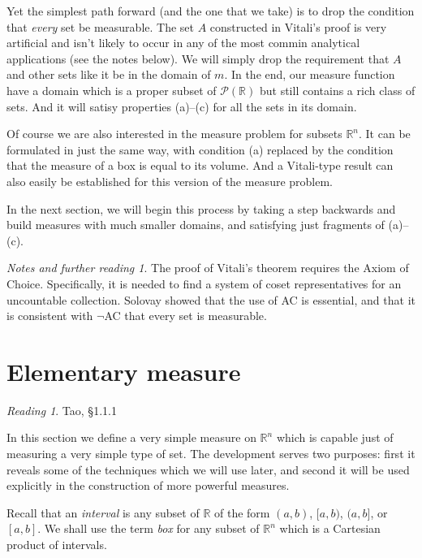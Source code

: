 \documentclass[11pt,oneside]{amsbook}
\newcommand{\RR}{\mathbb R}
\theoremstyle{definition}
\theoremstyle{plain}
\theoremstyle{definition}
\theoremstyle{remark}
\newtheorem*{notes}{Notes and further reading}
\newtheorem*{reading}{Reading}
\numberwithin{equation}{section}
\numberwithin{figure}{section}
\begin{document}
Yet the simplest path forward (and the one that we take) is to drop the condition that \emph{every} set be measurable. The set $A$ constructed in Vitali's proof is very artificial and isn't likely to occur in any of the most commin analytical applications (see the notes below). We will simply drop the requirement that $A$ and other sets like it be in the domain of $m$. In the end, our measure function have a domain which is a proper subset of $\mathcal P(\RR)$ but still contains a rich class of sets. And it will satisy properties (a)--(c) for all the sets in its domain.

Of course we are also interested in the measure problem for subsets $\RR^n$. It can be formulated in just the same way, with condition (a) replaced by the condition that the measure of a box is equal to its volume. And a Vitali-type result can also easily be established for this version of the measure problem.

In the next section, we will begin this process by taking a step backwards and build measures with much smaller domains, and satisfying just fragments of (a)--(c).

\begin{notes}
  The proof of Vitali's theorem requires the Axiom of Choice. Specifically, it is needed to find a system of coset representatives for an uncountable collection. Solovay showed that the use of AC is essential, and that it is consistent with $\neg$AC that every set is measurable.
\end{notes}

\section{Elementary measure}

\begin{reading}
  Tao, \S1.1.1
\end{reading}

In this section we define a very simple measure on $\RR^n$ which is capable just of measuring a very simple type of set. The development serves two purposes: first it reveals some of the techniques which we will use later, and second it will be used explicitly in the construction of more powerful measures.

Recall that an \emph{interval} is any subset of $\RR$ of the form $(a,b)$, $[a,b)$, $(a,b]$, or $[a,b]$. We shall use the term \emph{box} for any subset of $\RR^n$ which is a Cartesian product of intervals.
\end{document}
